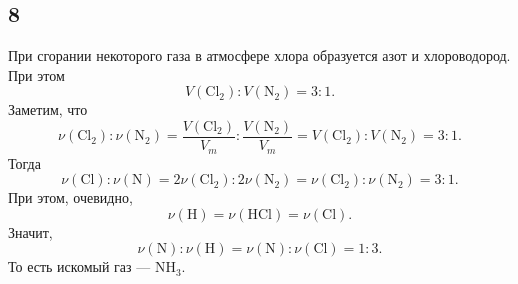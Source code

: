 \subsection{8}

При сгорании некоторого газа в атмосфере хлора образуется азот и хлороводород. При этом
\[
V(\mathrm{Cl_2}):V(\mathrm{N_2})=3:1.
\]
Заметим, что
\[
\nu(\mathrm{Cl_2}):\nu(\mathrm{N_2})=\frac{V(\mathrm{Cl_2})}{V_m}:\frac{V(\mathrm{N_2})}{V_m}=V(\mathrm{Cl_2}):V(\mathrm{N_2})=3:1.
\]
Тогда
\[
\nu(\mathrm{Cl}):\nu(\mathrm{N})=2\nu(\mathrm{Cl_2}):2\nu(\mathrm{N_2})=\nu(\mathrm{Cl_2}):\nu(\mathrm{N_2})=3:1.
\]
При этом, очевидно,
\[
\nu(\mathrm{H})=\nu(\mathrm{HCl})=\nu(\mathrm{Cl}).
\]
Значит,
\[
\nu(\mathrm{N}):\nu(\mathrm{H})=\nu(\mathrm{N}):\nu(\mathrm{Cl})=1:3.
\]
То есть искомый газ --- $\mathrm{NH_3}$.
